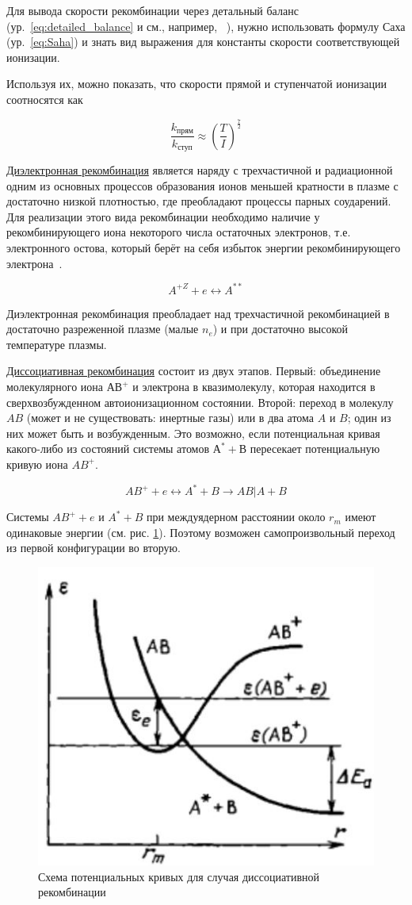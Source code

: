 \documentclass[10pt, a4paper]{article}
\numberwithin{equation}{section}
\begin{document}
Для вывода скорости рекомбинации через детальный баланс (ур.~\ref{eq:detailed_balance} и см., например, ~\cite{astap}), нужно использовать формулу Саха (ур.~\ref{eq:Saha}) и знать вид выражения для константы скорости соответствующей ионизации.

Используя их, можно показать, что скорости прямой и ступенчатой ионизации соотносятся как

\begin{equation}
	\frac{k_{\text{прям}}}{k_{\text{ступ}}} \approx \left(\frac{T}{I}\right)^{\frac{7}{2}}
\end{equation}

\uline{Диэлектронная рекомбинация} является наряду с трехчастичной и радиационной одним из основных процессов образования ионов меньшей кратности в плазме с достаточно низкой плотностью, где преобладают процессы парных соударений. Для реализации этого вида рекомбинации необходимо наличие у рекомбинирующего иона некоторого числа остаточных электронов, т.е. электронного остова, который берёт на себя избыток энергии рекомбинирующего электрона~\cite{astap, raizer}.

\begin{equation*}
	A^{+Z} + e \leftrightarrow A^{**}
\end{equation*}

Диэлектронная рекомбинация преобладает над трехчастичной рекомбинацией в достаточно разреженной плазме (малые $n_e$) и при достаточно высокой температуре плазмы.

\uline{Диссоциативная рекомбинация} состоит из двух этапов. Первый: объединение молекулярного иона $АВ^{+}$ и электрона в квазимолекулу, которая находится в сверхвозбужденном автоионизационном состоянии. Второй: переход в молекулу $AB$ (может и не существовать: инертные газы) или в два атома $A$ и $B$; один из них может быть и возбужденным. Это возможно, если потенциальная кривая какого-либо из состояний системы атомов $А^{*}+В$ пересекает потенциальную кривую иона $AB^{+}$.

\begin{equation*}
	AB^{+} + e \leftrightarrow A^{*}+B \rightarrow AB | A+B
\end{equation*}

Системы $AB^{+}+e$ и $A^{*}+B$ при междуядерном расстоянии около $r_m$ имеют одинаковые энергии (см. рис. \ref{fig:diss_recomb}). Поэтому возможен самопроизвольный переход из первой конфигурации во вторую. 

\begin{figure}[h!]
	\begin{center}
		\includegraphics[width=0.3\linewidth]{diss_recomb.jpg}
	\end{center}
	\caption{Схема потенциальных кривых для случая диссоциативной рекомбинации}
	\label{fig:diss_recomb}
\end{figure}
\end{document}
